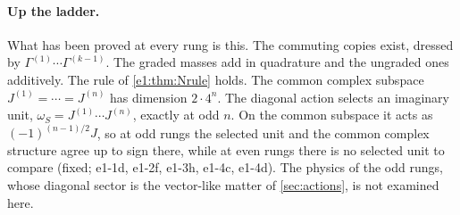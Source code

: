 \paragraph{Up the ladder.} What has been proved at every rung is this. The commuting copies exist, dressed by $\Gamma^{(1)}\cdots\Gamma^{(k-1)}$.
The graded masses add in quadrature and the ungraded ones additively. The rule of \cref{e1:thm:Nrule} holds. The common complex subspace
$J^{(1)}=\cdots=J^{(n)}$ has dimension $2\cdot4^n$. The diagonal action selects an imaginary unit, $\omega_S=J^{(1)}\cdots J^{(n)}$, exactly at
odd $n$. On the common subspace it acts as $(-1)^{(n-1)/2}J$, so at odd rungs the selected unit and the common complex structure agree up to
sign there, while at even rungs there is no selected unit to compare (fixed; e1-1d, e1-2f, e1-3h, e1-4c, e1-4d). The physics of the odd rungs, whose diagonal sector is the vector-like matter of \cref{sec:actions},
is not examined here.

